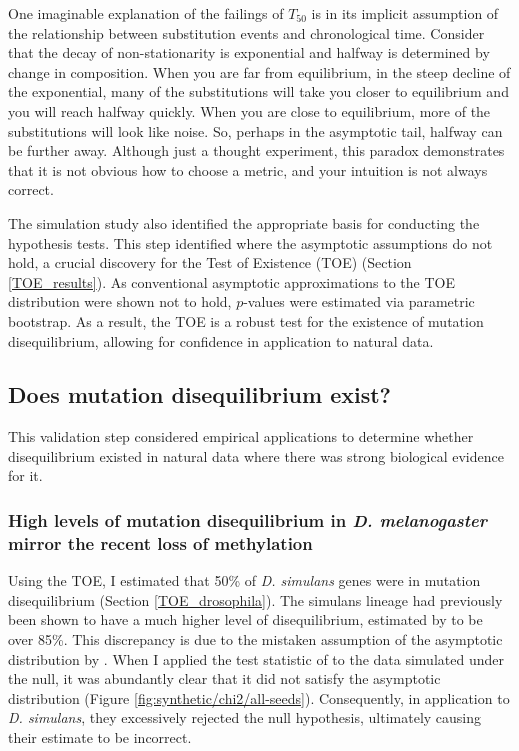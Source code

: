 One imaginable explanation of the failings of $T_{50}$ is in its implicit assumption of the relationship between substitution events and chronological time. Consider that the decay of non-stationarity is exponential and halfway is determined by change in composition. When you are far from equilibrium, in the steep decline of the exponential, many of the substitutions will take you closer to equilibrium and you will reach halfway quickly. When you are close to equilibrium, more of the substitutions will look like noise. So, perhaps in the asymptotic tail, halfway can be further away. Although just a thought experiment, this paradox demonstrates that it is not obvious how to choose a metric, and your intuition is not always correct. 

The simulation study also identified the appropriate basis for conducting the hypothesis tests. This step identified where the asymptotic assumptions do not hold, a crucial discovery for the Test of Existence (TOE) (Section \ref{TOE_results}). As conventional asymptotic approximations to the TOE distribution were shown not to hold, $p$-values were estimated via parametric bootstrap. As a result, the TOE is a robust test for the existence of mutation disequilibrium, allowing for confidence in application to natural data. 

\subsection{Does mutation disequilibrium exist?}

This validation step considered empirical applications to determine whether disequilibrium existed in natural data where there was strong biological evidence for it.

\subsubsection{High levels of mutation disequilibrium in \textit{D. melanogaster} mirror the recent loss of methylation}
Using the TOE, I estimated that 50\% of \textit{D. simulans} genes were in mutation disequilibrium (Section \ref{TOE_drosophila}). The simulans lineage had previously been shown to have a much higher level of disequilibrium, estimated by \cite{Squartini2008QuantifyingProcess} to be over 85\%. This discrepancy is due to the mistaken assumption of the asymptotic distribution by \cite{Squartini2008QuantifyingProcess}. When I applied the test statistic of \cite{Squartini2008QuantifyingProcess} to the data simulated under the null, it was abundantly clear that it did not satisfy the asymptotic distribution (Figure \ref{fig:synthetic/chi2/all-seeds}). Consequently, in application to \textit{D. simulans}, they excessively rejected the null hypothesis, ultimately causing their estimate to be incorrect.

